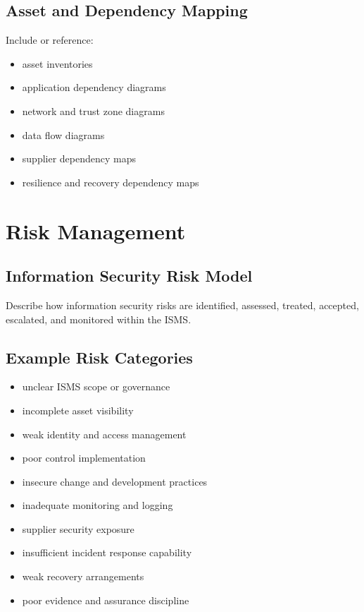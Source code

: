 \documentclass[
  letterpaper,
  DIV=11,
  numbers=noendperiod]{scrartcl}
\providecommand{\tightlist}{%
  \setlength{\itemsep}{0pt}\setlength{\parskip}{0pt}}
\begin{document}
\subsection{Asset and Dependency
Mapping}\label{asset-and-dependency-mapping}

Include or reference:

\begin{itemize}
\tightlist
\item
  asset inventories
\item
  application dependency diagrams
\item
  network and trust zone diagrams
\item
  data flow diagrams
\item
  supplier dependency maps
\item
  resilience and recovery dependency maps
\end{itemize}

\section{Risk Management}\label{risk-management}

\subsection{Information Security Risk
Model}\label{information-security-risk-model}

Describe how information security risks are identified, assessed,
treated, accepted, escalated, and monitored within the ISMS.

\subsection{Example Risk Categories}\label{example-risk-categories}

\begin{itemize}
\tightlist
\item
  unclear ISMS scope or governance
\item
  incomplete asset visibility
\item
  weak identity and access management
\item
  poor control implementation
\item
  insecure change and development practices
\item
  inadequate monitoring and logging
\item
  supplier security exposure
\item
  insufficient incident response capability
\item
  weak recovery arrangements
\item
  poor evidence and assurance discipline
\end{itemize}
\end{document}

